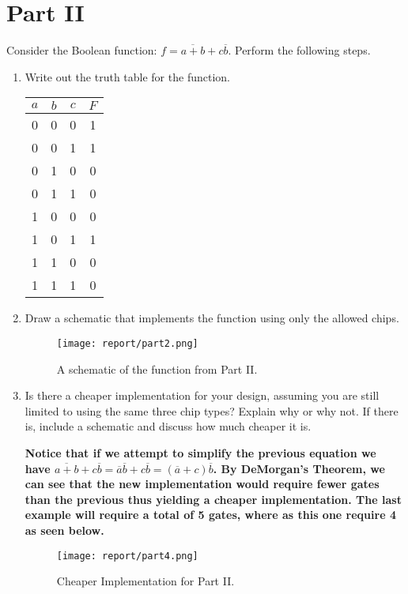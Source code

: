 \documentclass{article}
\begin{document}
\newpage
\section*{Part II}

Consider the Boolean function: $f = \overline{a + b} + c\overline{b}$.
Perform the following steps.

\begin{enumerate}

\item Write out the truth table for the function.
\begin{center}
  \begin{tabular}{cccc}
    $a$ & $b$ & $c$ & $F$ \\
    \hline
    0 & 0 & 0 & 1 \\
    0 & 0 & 1 & 1 \\
    0 & 1 & 0 & 0 \\
    0 & 1 & 1 & 0 \\
    1 & 0 & 0 & 0 \\
    1 & 0 & 1 & 1 \\
    1 & 1 & 0 & 0 \\
    1 & 1 & 1 & 0 \\
  \end{tabular}
\end{center}

\item Draw a schematic that implements the function using only the allowed chips.

\begin{figure}[h]
  \centering
  \texttt{[image: report/part2.png]}
  \caption{A schematic of the function from Part II.}
  \label{fig:part1}
\end{figure}


\item Is there a cheaper implementation for your design, assuming you are still limited to using the same three chip types?
    Explain why or why not.
    If there is, include a schematic and discuss how much cheaper it is.
\begin{center}
  \textbf{Notice that if we attempt to simplify the previous equation we have $\overline{a + b} + c\overline{b} = \overline{a} \overline{b} + c \overline{b} = ( \overline{a} + c)\overline{b}$. By DeMorgan's Theorem, we can see that the new implementation would require fewer gates than the previous thus yielding a cheaper implementation. The last example will require a total of 5 gates, where as this one require 4 as seen below.
  }

  \begin{figure}[h]
  \centering
  \texttt{[image: report/part4.png]}
   \caption{Cheaper Implementation for Part II.}
  \label{fig:part1}
\end{figure}
\end{center}

 
\end{enumerate}
\end{document}
